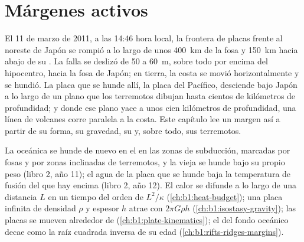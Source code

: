 \chapter{Márgenes activos}\label{ch:b1:active-margins}

El 11 de marzo de 2011, a las 14:46 hora local, la frontera de placas frente al noreste de Japón se rompió a lo largo de unos
\qty{400}{km} de la fosa y \qty{150}{km} hacia abajo de su . La falla se deslizó de 50 a \qty{60}{m}, sobre todo por encima del
hipocentro, hacia la fosa de Japón; en tierra, la costa se movió horizontalmente y se hundió. La placa que se hunde allí, la placa del
Pacífico, desciende bajo Japón a lo largo de un plano que los terremotos dibujan hasta cientos de kilómetros de profundidad; y donde ese
plano yace a unos cien kilómetros de profundidad, una línea de volcanes corre paralela a la costa. Este capítulo lee un margen así a partir
de su forma, su gravedad, su  y, sobre todo, sus terremotos.

\begin{recall}
La  oceánica se hunde de nuevo en el  en las zonas de subducción, marcadas por fosas y por zonas inclinadas de terremotos, y la
 vieja se hunde bajo su propio peso (libro 2, año 11); el agua de la placa que se hunde baja la temperatura de fusión del  que
hay encima (libro 2, año 12). El calor se difunde a lo largo de una distancia $L$ en un tiempo del orden de $L^2/\kappa$
(\cref{ch:b1:heat-budget}); una placa infinita de densidad $\rho$ y espesor $h$ atrae con $2\pi G\rho h$ (\cref{ch:b1:isostasy-gravity});
las placas se mueven alrededor de  (\cref{ch:b1:plate-kinematics}); el  del fondo oceánico decae como la raíz
cuadrada inversa de su edad (\cref{ch:b1:rifts-ridges-margins}).
\end{recall}

